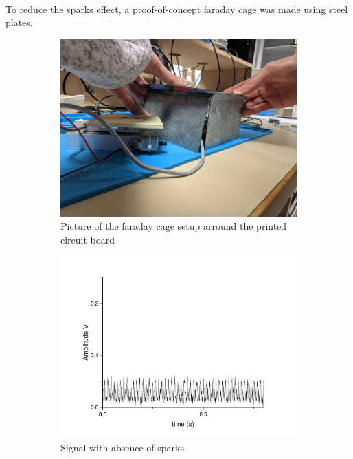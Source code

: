 \documentclass{article}[12pt]
\begin{document}
\paragraph{}
To reduce the sparks effect, a proof-of-concept faraday cage was made using steel plates. 
\begin{figure}[H]
\centering
\begin{subfigure}{.5\textwidth}
  \centering
  \includegraphics[width=\linewidth]{figures/faraday.jpg}
  \caption{Picture of the faraday cage setup arround the printed circuit board}
  \label{fig:faradaypic}
\end{subfigure}%
\begin{subfigure}{.5\textwidth}
  \centering
  \includegraphics[width=\linewidth]{figures/faraday.pdf}
  \caption{Signal with absence of sparks}
  \label{fig:faradaysig}
\end{subfigure}
\caption{}
\label{fig:faraday}
\end{figure}
\end{document}

